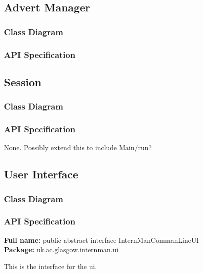 \documentclass[12pt]{article}
\begin{document}
\subsection{Advert Manager}

\subsubsection{Class Diagram}

\subsubsection{API Specification}

\subsection{Session}

\subsubsection{Class Diagram}

\subsubsection{API Specification}

None. Possibly extend this to include Main/run?

\subsection{User Interface}

\subsubsection{Class Diagram}

\subsubsection{API Specification}

\textbf{Full name:} public abstract interface InternManCommanLineUI\\

\textbf{Package:} uk.ac.glasgow.internman.ui

This is the interface for the ui.
\end{document}
